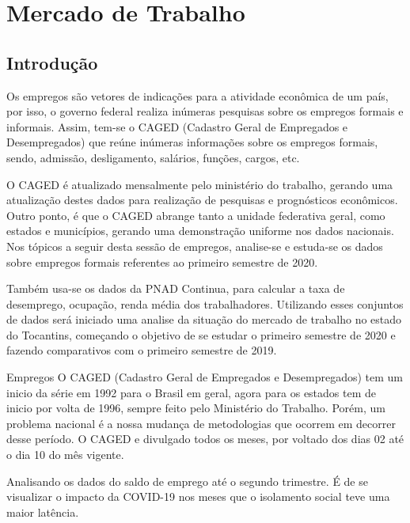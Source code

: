 \chapter{Mercado de Trabalho}

\section{Introdução}
\par Os empregos são  vetores de indicações para a atividade econômica de um país, por isso, o governo federal realiza inúmeras pesquisas sobre os empregos formais e informais. Assim, tem-se o CAGED (Cadastro Geral de Empregados e Desempregados) que reúne inúmeras informações sobre os empregos formais, sendo, admissão, desligamento, salários, funções, cargos, etc.
\par O CAGED é atualizado mensalmente pelo ministério do trabalho, gerando uma atualização destes dados para realização de pesquisas e prognósticos econômicos. Outro ponto, é que o CAGED abrange tanto a unidade federativa geral, como estados e municípios, gerando uma demonstração uniforme nos dados nacionais. Nos tópicos a seguir desta sessão de empregos, analise-se e estuda-se os dados sobre empregos formais referentes ao primeiro semestre de 2020.
\par Também usa-se os dados da PNAD Continua, para calcular a taxa de desemprego, ocupação, renda média dos trabalhadores. Utilizando esses conjuntos de dados será iniciado uma analise da situação do mercado de trabalho no estado do Tocantins, começando  o objetivo de se estudar o primeiro semestre de 2020 e fazendo comparativos com o primeiro semestre de 2019.

\begin{smbox}[label={labelbox},nameref={Empregos}]{Empregos}
O CAGED (Cadastro Geral de Empregados e Desempregados) tem um inicio da série em 1992 para o Brasil em geral, agora para os estados tem de inicio por volta de 1996, sempre feito pelo Ministério do Trabalho. Porém, um problema nacional é a nossa mudança de metodologias que ocorrem em decorrer desse período. O CAGED e divulgado todos os meses, por voltado dos dias 02 até o dia 10 do mês vigente.
\end{smbox}

\par Analisando os dados do saldo de emprego até o segundo trimestre. É de se visualizar o impacto da COVID-19 nos meses que o isolamento social teve uma maior latência.

